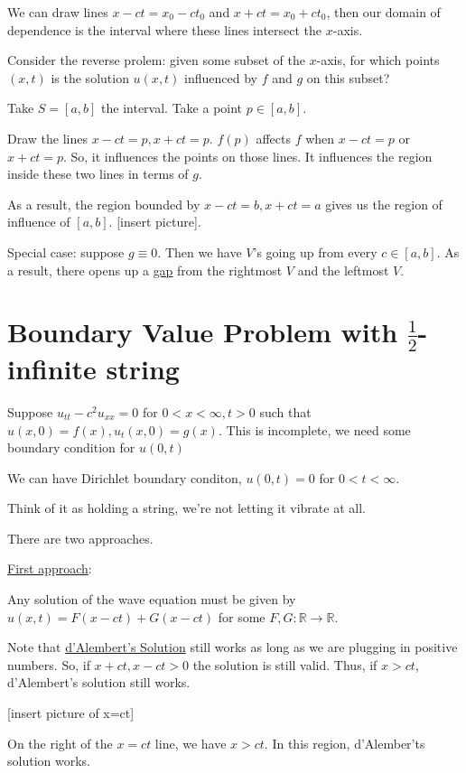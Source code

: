 \documentclass{article}
\theoremstyle{definition}
\begin{document}
We can draw lines \(x-ct = x_0 - ct_0\) and \(x+ct = x_0 + ct_0\), then our domain of dependence is the interval where these lines intersect the \(x\)-axis.

Consider the reverse prolem: given some subset of the \(x\)-axis, for which points \((x,t)\) is the solution \(u(x,t)\) influenced by \(f\) and \(g\) on this subset?

Take \(S = [a,b]\) the interval. Take a point \(p\in [a,b]\).

Draw the lines \(x-ct = p, x+ct = p\). \(f(p)\) affects \(f\) when \(x-ct = p\) or \(x + ct = p\). So, it influences the points on those lines. It influences the region inside these two lines in terms of \(g\).

As a result, the region bounded by \(x-ct = b, x+ct = a\) gives us the region of influence of \([a,b]\). [insert picture].

Special case: suppose \(g \equiv 0\). Then we have \(V\)'s going up from every \(c\in [a,b]\). As a result, there opens up a \underline{gap} from the rightmost \(V\) and the leftmost \(V\).

\section*{Boundary Value Problem with \(\frac{1}{2}\)-infinite string}

Suppose \(u_{tt} - c^2 u_{xx} = 0\) for \(0 < x < \infty, t>0\) such that \(u(x,0)=f(x),u_t(x,0)=g(x)\). This is incomplete, we need some boundary condition for \(u(0,t)\) 

We can have Dirichlet boundary conditon, \(u(0,t)=0\) for \(0 < t < \infty\).

Think of it as holding a string, we're not letting it vibrate at all.

There are two approaches.

\underline{First approach}:

Any solution of the wave equation must be given by \(u(x,t)=F(x-ct)+G(x-ct)\) for some \(F,G:\mathbb{R} \to \mathbb{R}\).

Note that \underline{d'Alembert's Solution} still works as long as we are plugging in positive numbers. So, if \(x+ct,x-ct>0\) the solution is still valid. Thus, if \(x > ct\), d'Alembert's solution still works.

[insert picture of x=ct]

On the right of the \(x=ct\) line, we have \(x > ct\). In this region, d'Alember'ts solution works.
\end{document}
